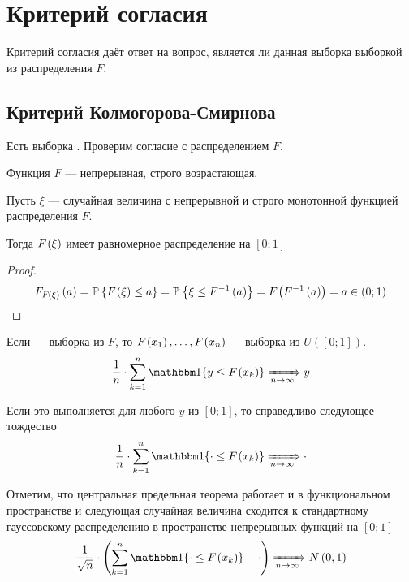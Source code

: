 \section{Критерий согласия}

Критерий согласия даёт ответ на вопрос, является ли данная выборка
\xsample выборкой из распределения $F$.

\subsection{Критерий Колмогорова-Смирнова}

Есть выборка \xsample. Проверим согласие с распределением $F$.

Функция $F$ --- непрерывная, строго возрастающая.

\begin{lemma}
  Пусть $\xi$ --- случайная величина с непрерывной и строго монотонной
  функцией распределения $F$.

  Тогда $F_{}\left(\xi\right)$ имеет равномерное распределение на $\left[ 0; 1 \right]$
\end{lemma}
\begin{proof}
  \begin{align*}
      F_{F_{}\left(\xi\right)}\left(a\right)
      = \mathbb{P}_{{}}\left\{ F_{}\left(\xi\right) \le a \right\}
      = \mathbb{P}_{{}}\left\{ \xi \le F^{-1}\left( a \right) \right\}
      = F_{}\left(F^{-1}\left( a \right)\right)
      = a \in \left( 0; 1 \right)
  \end{align*}
\end{proof}

Если \xsample --- выборка из $F$, то $F_{}\left(x_1\right), \dots, F_{}\left(x_n\right)$
--- выборка из $U\left( \left[ 0; 1 \right] \right)$.
\begin{align*}
  \frac{1}{n} \cdot \sum_{k=1}^{n}\Indicator{y \le \cdf{x_k}}
  \Covergence{} y
\end{align*}

Если это выполняется для любого $y$ из $\left[ 0; 1 \right]$, то справедливо
следующее тождество
\begin{align*}
  \frac{1}{n} \cdot \sum_{k=1}^{n}\Indicator{\cdot \le \cdf{x_k}}
  \Covergence{} \cdot
\end{align*}

Отметим, что центральная предельная теорема работает и в функциональном
пространстве и следующая случайная величина сходится к стандартному гауссовскому
распределению в пространстве непрерывных функций на $\left[ 0; 1 \right]$
\begin{align*}
  \frac{1}{\sqrt{n}} \cdot \left(
      \sum_{k=1}^{n}\Indicator{\cdot \le \cdf{x_k}} - \cdot \right)
  \Covergence{} N\left( 0, 1 \right)
\end{align*}

